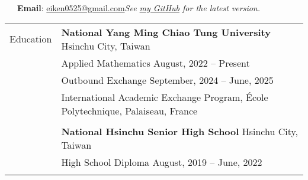 \documentclass[letterpaper, 11pt]{article}
\begin{document}


\vspace{0.5cm} 
\noindent\:\ \ \ \textbf{Email}: \href{mailto:eiken0525@gmail.com}{eiken0525@gmail.com}\hfill \textit{\footnotesize See \href{https://github.com/eiken59/CV/blob/main/eiken59_CV.pdf}{my GitHub} for the latest version.\ \ \ \ \,}


\setlength{\tabcolsep}{8pt}
\vspace{-1.5em}
\begin{center}
    \begin{longtable}{p{0.74in}p{5.95in}}

        
        
        
        \textcolor{OliveGreen}{Education} 
        & \textbf{National Yang Ming Chiao Tung University} \hfill Hsinchu City, Taiwan \\ 
        & Applied Mathematics \hfill August, 2022 -- Present \\
        & Outbound Exchange \hfill September, 2024 -- June, 2025\\
        & \qquad International Academic Exchange Program, \'Ecole Polytechnique, Palaiseau, France \\
        & \\
        
        & \textbf{National Hsinchu Senior High School} \hfill Hsinchu City, Taiwan \\
        & High School Diploma \hfill August, 2019 -- June, 2022\\
        & \\
        
        

\end{longtable}
\end{center}
\end{document}
